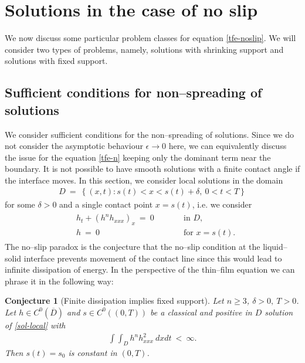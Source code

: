 \documentclass[pagesize,pdftex]{amsart}
\newtheorem{conjecture}[theorem]{Conjecture}
\newcommand{\OL}[0]{\overline} %
\renewcommand{\d}{\delta}
\newcommand{\eps}{\epsilon}
\renewcommand{\iint}{\int\!\!\!\!\int}
\begin{document}
\section{Solutions in the case of no slip} \label{sec-noslip} %

We now discuss some particular problem classes for equation
\eqref{tfe-noslip}. We will consider two types of problems, namely, solutions
with shrinking support and solutions with fixed support.

\subsection{Sufficient conditions for non--spreading of solutions}

We consider sufficient conditions for the non--spreading of solutions. Since we
do not consider the asymptotic behaviour $\eps \to 0$ here, we can equivalently
discuss the issue for the equation \eqref{tfe-n} keeping only the dominant term
near the boundary. It is not possible to have smooth solutions with a finite
contact angle if the interface moves. In this section, we consider local
solutions in the domain
\begin{align}
  D \  =  \ \left\{ (x,t) :s(t) <x<s(t) + \d ,\ 0<t<T\right\} 
\end{align}
for some $\d > 0$ and a single contact point $x = s(t)$, i.e. we consider
\begin{align} \label{sol-local} %
  \begin{aligned}
    &h_t + (h^n h_{xxx})_x \ = \ 0 \qquad &&\text{in $D$}, \\
    &h \ = \ 0 \qquad &&\text{for $x = s(t)$}.
  \end{aligned}
\end{align}
The no--slip paradox is the conjecture that the no--slip condition at the
liquid--solid interface prevents movement of the contact line since this would
lead to infinite dissipation of energy. In the perspective of the thin--film
equation we can phrase it in the following way:
\begin{conjecture}[Finite dissipation implies fixed support] %
  Let $n \geq 3$, $\d >0,\ T>0$. Let $h\in C^0(\OL D)$ and $s\in C^0((0,T))$ be
  a classical and positive in $D$ solution of \eqref{sol-local} with %
  \begin{align} \label{S1E8} %
    \iint_{D} h^n  h_{xxx}^{2} \ dxdt \ < \ \infty.  
  \end{align}
  Then $s(t) = s_0$ is constant in $(0,T)$.
\end{conjecture}
\end{document}
